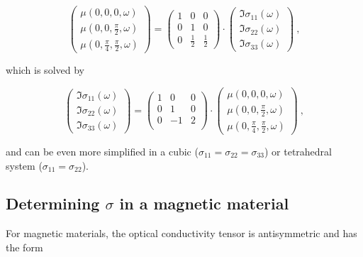 \documentclass[twocolumn,prb,twocolumn,amsmath,superscriptaddress,nofootinbib,amssymb]{revtex4-1}
\begin{document}
\begin{widetext}
\begin{equation}
\left(
\begin{array}{c}
\mu(0,0,0,\omega)  \\
\mu(0,0,\frac{\pi}{2},\omega)   \\
\mu(0,\frac{\pi}{4},\frac{\pi}{2},\omega)
\end{array}
\right)
=
\left(
\begin{array}{ccc}
1  & 0  & 0 \\
0  & 1  & 0 \\
0  & \frac{1}{2} &  \frac{1}{2}
\end{array}
\right)\cdot
\left(
\begin{array}{c}
\Im{\sigma _{11}}(\omega)  \\
\Im{\sigma _{22}}(\omega)   \\
  \Im{\sigma _{33}}(\omega)
\end{array}
\right)~,
\end{equation}

\noindent which is solved by

\begin{equation}
\left(
\begin{array}{c}
\Im{\sigma _{11}}(\omega)  \\
\Im{\sigma _{22}}(\omega)   \\
  \Im{\sigma _{33}}(\omega)
\end{array}
\right)
=
\left(
\begin{array}{cccccc}
1 & 0 & 0 \\
0 & 1 & 0 \\
0 & -1 & 2 \\
\end{array}
\right)\cdot
\left(
\begin{array}{c}
\mu(0,0,0,\omega)  \\
\mu(0,0,\frac{\pi}{2},\omega)   \\
\mu(0,\frac{\pi}{4},\frac{\pi}{2},\omega)
\end{array}
\right)~,
\end{equation}

\noindent and can be even more simplified in a cubic ($\sigma_{11}=\sigma_{22}=\sigma_{33}$) or tetrahedral system ($\sigma_{11}=\sigma_{22}$).

\subsection{Determining $\sigma$ in a magnetic material }

For magnetic materials, the optical conductivity tensor is antisymmetric and has the form


\end{widetext}
\end{document}
